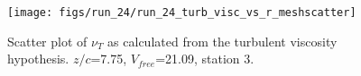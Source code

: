 \begin{figure}[H]
\centering
\texttt{[image: figs/run\_24/run\_24\_turb\_visc\_vs\_r\_meshscatter]}
\caption{Scatter plot of $\nu_T$ as calculated from the turbulent viscosity hypothesis. $z/c$=7.75, $V_{free}$=21.09, station 3.}
\label{fig:run_24_turb_visc_vs_r_meshscatter}
\end{figure}



